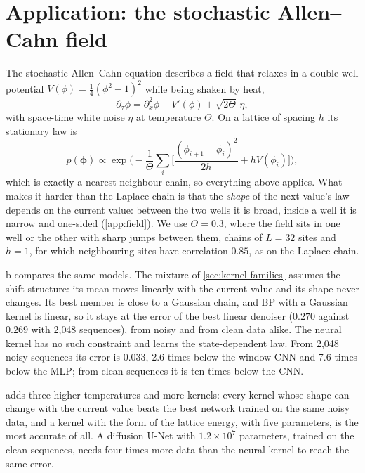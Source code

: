 \section{Application: the stochastic Allen--Cahn field}
\label{sec:allen-cahn}

The stochastic Allen--Cahn equation \cite{allen1979microscopic,dapratozabczyk2014} describes a field that relaxes in a
double-well potential $V(\phi)=\tfrac14(\phi^2-1)^2$ while being shaken by heat,
\begin{equation}
  \partial_\tau\phi=\partial_x^2\phi-V'(\phi)+\sqrt{2\Theta}\,\eta,
\end{equation}
with space-time white noise $\eta$ at temperature $\Theta$. On a lattice of spacing $h$ its stationary law is
\begin{equation}
  p(\boldsymbol\phi)\propto\exp\Big(-\frac1\Theta\sum_i\Big[\frac{(\phi_{i+1}-\phi_i)^2}{2h}+hV(\phi_i)\Big]\Big),
\end{equation}
which is exactly a nearest-neighbour chain, so everything above applies. What makes it harder than the Laplace chain is
that the \emph{shape} of the next value's law depends on the current value: between the two wells it is broad, inside a
well it is narrow and one-sided (\cref{app:field}). We use $\Theta=0.3$, where the field sits in one well or the other
with sharp jumps between them, chains of $L=32$ sites and $h=1$, for which neighbouring sites have correlation $0.85$, as
on the Laplace chain.

b compares the same models. The mixture of \cref{sec:kernel-families} assumes the shift structure:
its mean moves linearly with the current value and its shape never changes. Its best member is close to a Gaussian
chain, and BP with a Gaussian kernel is linear, so it stays at the error of the best linear denoiser ($0.270$ against
$0.269$ with 2{,}048 sequences), from noisy and from clean data alike. The neural kernel has no such constraint and
learns the state-dependent law. From 2{,}048 noisy sequences its error is $0.033$, 2.6 times below the window CNN and
7.6 times below the MLP; from clean sequences it is ten times below the CNN. 

 adds three higher temperatures and more kernels: every kernel whose shape can change with the current
value beats the best network trained on the same noisy data, and a kernel with the form of the lattice energy, with five
parameters, is the most accurate of all. A diffusion U-Net with $1.2\times10^{7}$ parameters, trained on the clean
sequences, needs four times more data than the neural kernel to reach the same error.
